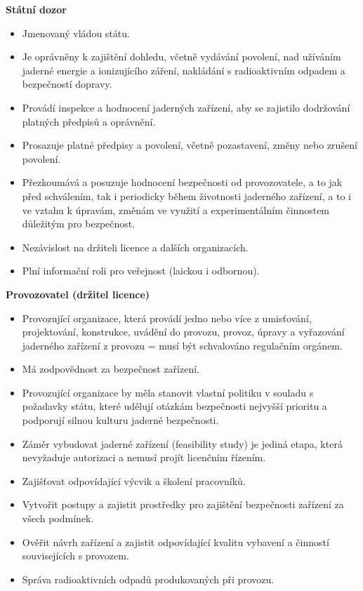 \textbf{Státní dozor}

\begin{itemize}
    \item Jmenovaný vládou státu.
    \item Je oprávněny k zajištění dohledu, včetně vydávání povolení, nad užíváním jaderné energie a ionizujícího záření, nakládání s radioaktivním odpadem a bezpečností dopravy.
    \item Provádí inspekce a hodnocení jaderných zařízení, aby se zajistilo dodržování platných předpisů a oprávnění.
    \item Prosazuje platné předpisy a povolení, včetně pozastavení, změny nebo zrušení povolení.
    \item Přezkoumává a posuzuje hodnocení bezpečnosti od provozovatele, a to jak před schválením, tak i periodicky během životnosti jaderného zařízení, a to i ve vztahu k úpravám, změnám ve využití a experimentálním činnostem důležitým pro bezpečnost.
    \item Nezávislost na držiteli licence a dalších organizacích.
    \item Plní informační roli pro veřejnost (laickou i odbornou).
\end{itemize}

\textbf{Provozovatel (držitel licence)}

\begin{itemize}
    \item Provozující organizace, která provádí jedno nebo více z umisťování, projektování, konstrukce, uvádění do provozu, provoz, úpravy a vyřazování jaderného zařízení z provozu = musí být schvalováno regulačním orgánem.
    \item Má zodpovědnost za bezpečnost zařízení.
    \item Provozující organizace by měla stanovit vlastní politiku v souladu s požadavky státu, které udělují otázkám bezpečnosti nejvyšší prioritu a podporují silnou kulturu jaderné bezpečnosti.
    \item Záměr vybudovat jaderné zařízení (feasibility study) je jediná etapa, která nevyžaduje autorizaci a nemusí projít licenčním řízením.
    \item Zajišťovat odpovídající výcvik a školení pracovníků.
    \item Vytvořit postupy a zajistit prostředky pro zajištění bezpečnosti zařízení za všech podmínek.
    \item Ověřit návrh zařízení a zajistit odpovídající kvalitu vybavení a činností souvisejících s provozem.
    \item Správa radioaktivních odpadů produkovaných při provozu.
\end{itemize}

